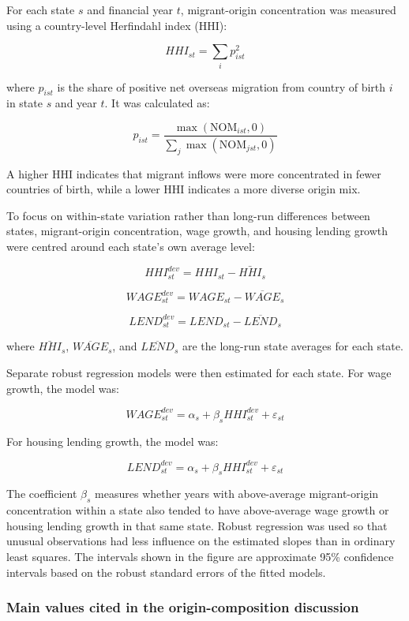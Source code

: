 \documentclass[
  11pt,
  a4paper,
]{article}
\begin{document}
For each state \(s\) and financial year \(t\), migrant-origin
concentration was measured using a country-level Herfindahl index (HHI):

\[
HHI_{st} = \sum_i p_{ist}^2
\]

where \(p_{ist}\) is the share of positive net overseas migration from
country of birth \(i\) in state \(s\) and year \(t\). It was calculated
as:

\[
p_{ist} = \frac{\max(\mathrm{NOM}_{ist}, 0)}{\sum_j \max(\mathrm{NOM}_{jst}, 0)}
\]

A higher HHI indicates that migrant inflows were more concentrated in
fewer countries of birth, while a lower HHI indicates a more diverse
origin mix.

To focus on within-state variation rather than long-run differences
between states, migrant-origin concentration, wage growth, and housing
lending growth were centred around each state's own average level:

\[
HHI^{dev}_{st} = HHI_{st} - \bar{HHI}_s
\]

\[
WAGE^{dev}_{st} = WAGE_{st} - \overline{WAGE}_s
\]

\[
LEND^{dev}_{st} = LEND_{st} - \overline{LEND}_s
\]

where \(\bar{HHI}_s\), \(\overline{WAGE}_s\), and \(\overline{LEND}_s\)
are the long-run state averages for each state.

Separate robust regression models were then estimated for each state.
For wage growth, the model was:

\[
WAGE^{dev}_{st} = \alpha_s + \beta_s HHI^{dev}_{st} + \varepsilon_{st}
\]

For housing lending growth, the model was:

\[
LEND^{dev}_{st} = \alpha_s + \beta_s HHI^{dev}_{st} + \varepsilon_{st}
\]

The coefficient \(\beta_s\) measures whether years with above-average
migrant-origin concentration within a state also tended to have
above-average wage growth or housing lending growth in that same state.
Robust regression was used so that unusual observations had less
influence on the estimated slopes than in ordinary least squares. The
intervals shown in the figure are approximate 95\% confidence intervals
based on the robust standard errors of the fitted models.

\subsubsection{Main values cited in the origin-composition
discussion}\label{main-values-cited-in-the-origin-composition-discussion}
\end{document}

